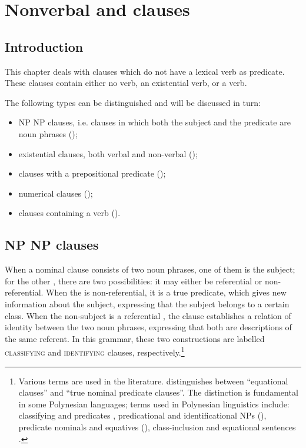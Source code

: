 \chapter[Nonverbal and \isi{copular} clauses]{Nonverbal and  clauses}\label{ch:9}
\section{Introduction}\label{sec:9.1}

This chapter deals with clauses which do not have a lexical verb as predicate. These clauses contain either no verb, an existential verb, or a  verb. 

The following types can be distinguished and will be discussed in turn: 

\begin{itemize}
\item 
NP NP clauses, i.e. clauses in which both the subject and the predicate are noun phrases ();

\item 
existential clauses, both verbal and non-verbal ();

\item 
clauses with a prepositional predicate ();

\item 
numerical clauses ();

\item 
clauses containing a  verb ().

\end{itemize}
\section{NP NP clauses}\label{sec:9.2}

When a nominal clause consists of two noun phrases, one of them is the subject; for the other , there are two possibilities: it may either be referential or non-referential. When the  is non-referential, it is a true predicate, which gives new information about the subject, expressing that the subject belongs to a certain class. When the non-subject  is a referential , the clause establishes a relation of identity between the two noun phrases, expressing that both are descriptions of the same referent. In this grammar, these two constructions are labelled \textsc{classifying} and \textsc{identifying} clauses, respectively.\footnote{\label{fn:459}Various terms are used in the literature. \citet[233]{Dryer2007Clause} distinguishes between “equational clauses” and “true nominal predicate clauses”. The distinction is fundamental in some Polynesian languages; terms used in Polynesian linguistics include: classifying and  predicates \citep[78]{Bauer1993}, predicational and identificational NPs (\citealt[430]{ChungMason1995}), predicate nominals and equatives (\citealt{DeLacy1999}), class-inclusion and equational sentences \citep[45]{Cook1999}.}

